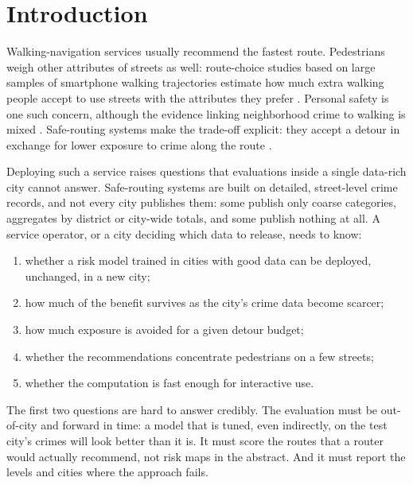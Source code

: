 \documentclass[preprint,12pt,authoryear]{elsarticle}
\begin{document}
\section{Introduction}

Walking-navigation services usually recommend the fastest route. Pedestrians weigh other attributes of streets as well: route-choice studies based on large samples of smartphone walking trajectories estimate how much extra walking people accept to use streets with the attributes they prefer \citep{sevtsuk2021routechoice,basu2022willingness}. Personal safety is one such concern, although the evidence linking neighborhood crime to walking is mixed \citep{foster2008crime}. Safe-routing systems make the trade-off explicit: they accept a detour in exchange for lower exposure to crime along the route \citep{galbrun2016safe}.

Deploying such a service raises questions that evaluations inside a single data-rich city cannot answer. Safe-routing systems are built on detailed, street-level crime records, and not every city publishes them: some publish only coarse categories, aggregates by district or city-wide totals, and some publish nothing at all. A service operator, or a city deciding which data to release, needs to know:
\begin{enumerate}
  \item whether a risk model trained in cities with good data can be deployed, unchanged, in a new city;
  \item how much of the benefit survives as the city's crime data become scarcer;
  \item how much exposure is avoided for a given detour budget;
  \item whether the recommendations concentrate pedestrians on a few streets;
  \item whether the computation is fast enough for interactive use.
\end{enumerate}

The first two questions are hard to answer credibly. The evaluation must be out-of-city and forward in time: a model that is tuned, even indirectly, on the test city's crimes will look better than it is. It must score the routes that a router would actually recommend, not risk maps in the abstract. And it must report the levels and cities where the approach fails.
\end{document}
